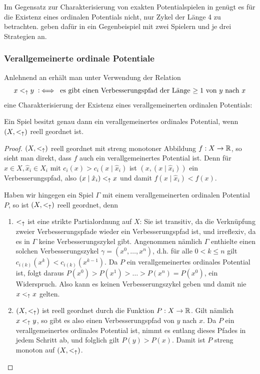 \begin{bem}
	Im Gegensatz zur Charakterisierung von exakten Potentialspielen in  genügt es für die Existenz eines ordinalen Potentials nicht, nur Zykel der Länge 4 zu betrachten. \citeauthor{CharExOrdPot} geben dafür in \cite[Beispiel 3.1]{CharExOrdPot} ein Gegenbeispiel mit zwei Spielern und je drei Strategien an.
\end{bem}


\subsubsection{Verallgemeinerte ordinale Potentiale}

Anlehnend an  erhält man unter Verwendung der Relation
	\[x <_\uparrow y \mathbin{~\mathop:\!\!\iff} \text{ es gibt einen Verbesserungspfad der Länge $\geq 1$ von $y$ nach $x$}\]
eine Charakterisierung der Existenz eines verallgemeinerten ordinalen Potentials:
\begin{satz}\label{satz:CharVerallOrdPot}
	Ein Spiel besitzt genau dann ein verallgemeinertes ordinales Potential, wenn $(X, <_\uparrow)$ reell geordnet ist.
\end{satz}

\begin{proof}
	$(X, <_\uparrow)$ reell geordnet mit streng monotoner Abbildung $f: X \to \mathbb{R}$, so sieht man direkt, dass $f$ auch ein verallgemeinertes Potential ist. Denn für $x \in X, \hat{x}_i \in X_i$ mit $c_i(x) > c_i(x \mid \hat{x}_i)$ ist $(x, (x \mid \hat{x}_i))$ ein Verbesserungspfad, also $(x \mid \hat{x}_i) <_\uparrow x$ und damit $f(x \mid \hat{x}_i) < f(x)$.
	
	Haben wir hingegen ein Spiel $\Gamma$ mit einem verallgemeinerten ordinalen Potential $P$, so ist $(X, <_\uparrow)$ reell geordnet, denn
	\begin{enumerate}
		\item $<_\uparrow$ ist eine strikte Partialordnung auf $X$: Sie ist transitiv, da die Verknüpfung zweier Verbesserungspfade wieder ein Verbesserungspfad ist, und irreflexiv, da es in $\Gamma$ keine Verbesserungszykel gibt. Angenommen nämlich $\Gamma$ enthielte einen solchen Verbesserungszykel $\gamma = (x^0, \dots, x^n)$, d.h. für alle $0 < k \leq n$ gilt $c_{i(k)}(x^k) < c_{i(k)}(x^{k-1})$. Da $P$ ein verallgemeinertes ordinales Potential ist, folgt daraus $P(x^0) > P(x^1) > \dots > P(x^n) = P(x^0)$, ein Widerspruch. Also kann es keinen Verbesserungszykel geben und damit nie $x <_\uparrow x$ gelten.
		\item $(X, <_\uparrow)$ ist reell geordnet durch die Funktion $P: X \to \mathbb{R}$. Gilt nämlich $x <_\uparrow y$, so gibt es also einen Verbesserungspfad von $y$ nach $x$. Da $P$ ein verallgemeinertes ordinales Potential ist, nimmt es entlang dieses Pfades in jedem Schritt ab, und folglich gilt $P(y) > P(x)$. Damit ist $P$ streng monoton auf $(X, <_\uparrow)$. \qedhere
	\end{enumerate} 
\end{proof}

